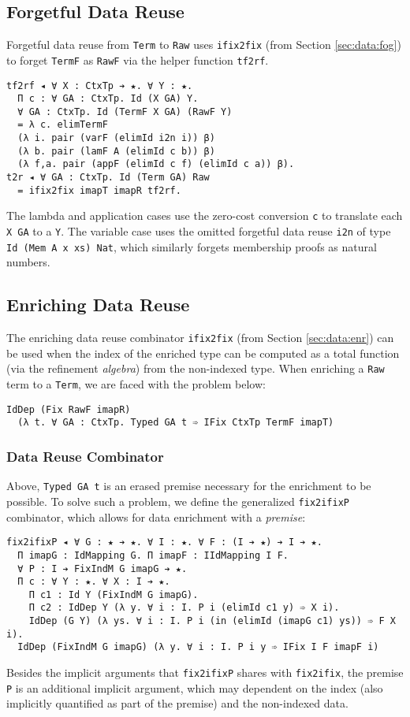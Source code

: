 \documentclass[acmsmall,screen]{acmart}
\newcommand{\refsec}[1]{Section \ref{sec:#1}}
\newcommand{\labsec}[1]{\label{sec:#1}}
\begin{document}
\subsection{Forgetful Data Reuse}
\labsec{rel:dfog}

Forgetful data reuse from \verb;Term; to \verb;Raw; uses
\verb;ifix2fix; (from \refsec{data:fog}) to forget
\verb;TermF; as \verb;RawF; via the helper function
\verb;tf2rf;. 
\begin{verbatim}
tf2rf ◂ ∀ X : CtxTp ➔ ★. ∀ Y : ★.
  Π c : ∀ GA : CtxTp. Id (X GA) Y.
  ∀ GA : CtxTp. Id (TermF X GA) (RawF Y)
  = λ c. elimTermF
  (λ i. pair (varF (elimId i2n i)) β)
  (λ b. pair (lamF A (elimId c b)) β)
  (λ f,a. pair (appF (elimId c f) (elimId c a)) β).
t2r ◂ ∀ GA : CtxTp. Id (Term GA) Raw
  = ifix2fix imapT imapR tf2rf.
\end{verbatim}
The lambda and application cases use the zero-cost conversion \verb;c;
to translate each \verb;X GA; to a \verb;Y;. The variable case uses the
omitted forgetful data reuse \verb;i2n; of type
\verb;Id (Mem A x xs) Nat;, which similarly forgets membership proofs
as natural numbers.

\subsection{Enriching Data Reuse}
\labsec{rel:denr}

The enriching data reuse combinator \verb;ifix2fix; (from
\refsec{data:enr}) can be used when the index of the enriched type can
be computed as a total function (via the refinement \textit{algebra}) from
the non-indexed type.
When enriching a \verb;Raw; term to a
\verb;Term;, we are faced with the problem below:
\begin{verbatim}
IdDep (Fix RawF imapR) 
  (λ t. ∀ GA : CtxTp. Typed GA t ➾ IFix CtxTp TermF imapT)
\end{verbatim}

\subsubsection{Data Reuse Combinator}

Above, \verb;Typed GA t; is an erased premise necessary for the
enrichment to be possible. To solve such a problem, we define the
generalized \verb;fix2ifixP; combinator, which allows for data
enrichment with a \textit{premise}:
\begin{verbatim}
fix2ifixP ◂ ∀ G : ★ ➔ ★. ∀ I : ★. ∀ F : (I ➔ ★) ➔ I ➔ ★.
  Π imapG : IdMapping G. Π imapF : IIdMapping I F.
  ∀ P : I ➔ FixIndM G imapG ➔ ★.
  Π c : ∀ Y : ★. ∀ X : I ➔ ★.
    Π c1 : Id Y (FixIndM G imapG).
    Π c2 : IdDep Y (λ y. ∀ i : I. P i (elimId c1 y) ➾ X i).
    IdDep (G Y) (λ ys. ∀ i : I. P i (in (elimId (imapG c1) ys)) ➾ F X i).
  IdDep (FixIndM G imapG) (λ y. ∀ i : I. P i y ➾ IFix I F imapF i)
\end{verbatim}
Besides the implicit arguments that \verb;fix2ifixP; shares with
\verb;fix2ifix;, the premise \verb;P; is an additional implicit
argument, which may dependent on the index (also implicitly quantified
as part of the premise) and the non-indexed data.
\end{document}
